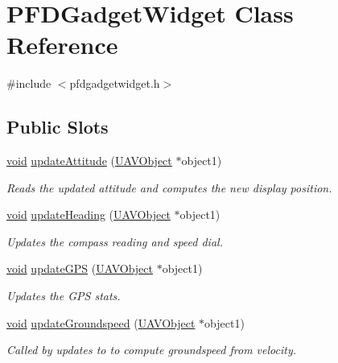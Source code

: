 \hypertarget{class_p_f_d_gadget_widget}{\section{\-P\-F\-D\-Gadget\-Widget \-Class \-Reference}
\label{class_p_f_d_gadget_widget}
}


{\ttfamily \#include $<$pfdgadgetwidget.\-h$>$}

\subsection*{\-Public \-Slots}
\begin{DoxyCompactItemize}
\item 
\hyperlink{group___u_a_v_objects_plugin_ga444cf2ff3f0ecbe028adce838d373f5c}{void} \hyperlink{group___p_f_d_plugin_ga3cedb8f54fcd0c4662e91b56c6043fc2}{update\-Attitude} (\hyperlink{class_u_a_v_object}{\-U\-A\-V\-Object} $\ast$object1)
\begin{DoxyCompactList}\small\item\em \-Reads the updated attitude and computes the new display position. \end{DoxyCompactList}\item 
\hyperlink{group___u_a_v_objects_plugin_ga444cf2ff3f0ecbe028adce838d373f5c}{void} \hyperlink{group___p_f_d_plugin_ga4d4bf76026c83f20e97e02adb4cf46f7}{update\-Heading} (\hyperlink{class_u_a_v_object}{\-U\-A\-V\-Object} $\ast$object1)
\begin{DoxyCompactList}\small\item\em \-Updates the compass reading and speed dial. \end{DoxyCompactList}\item 
\hyperlink{group___u_a_v_objects_plugin_ga444cf2ff3f0ecbe028adce838d373f5c}{void} \hyperlink{group___o_p_map_plugin_ga469cc6075704bce32507f7561422a3ff}{update\-G\-P\-S} (\hyperlink{class_u_a_v_object}{\-U\-A\-V\-Object} $\ast$object1)
\begin{DoxyCompactList}\small\item\em \-Updates the \-G\-P\-S stats. \end{DoxyCompactList}\item 
\hyperlink{group___u_a_v_objects_plugin_ga444cf2ff3f0ecbe028adce838d373f5c}{void} \hyperlink{group___o_p_map_plugin_gafcdd8249475fe6543b75829cdc19b279}{update\-Groundspeed} (\hyperlink{class_u_a_v_object}{\-U\-A\-V\-Object} $\ast$object1)
\begin{DoxyCompactList}\small\item\em \-Called by updates to  to compute groundspeed from velocity. \end{DoxyCompactList}\item 

\end{DoxyCompactItemize}
